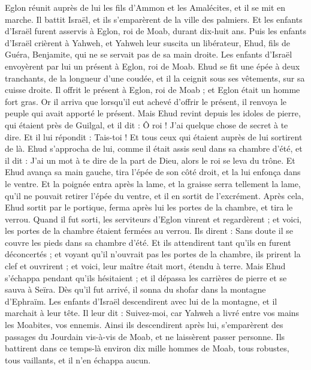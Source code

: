 \begin{multicols}{2}
Eglon réunit auprès de lui les fils d'Ammon et les Amalécites, et il se mit en marche. Il battit Israël, et ils s'emparèrent de la ville des palmiers.
Et les enfants d'Israël furent asservis à Eglon, roi de Moab, durant dix-huit ans.
Puis les enfants d'Israël crièrent à Yahweh, et Yahweh leur suscita un libérateur, Ehud, fils de Guéra, Benjamite, qui ne se servait pas de sa main droite. Les enfants d'Israël envoyèrent par lui un présent à Eglon, roi de Moab.
Ehud se fit une épée à deux tranchants, de la longueur d'une coudée, et il la ceignit sous ses vêtements, sur sa cuisse droite.
Il offrit le présent à Eglon, roi de Moab ; et Eglon était un homme fort gras.
Or il arriva que lorsqu’il eut achevé d’offrir le présent, il renvoya le peuple qui avait apporté le présent.
Mais Ehud revint depuis les idoles de pierre, qui étaient près de Guilgal, et il dit : Ô roi ! J’ai quelque chose de secret à te dire. Et il lui répondit : Tais-toi ! Et tous ceux qui étaient auprès de lui sortirent de là.
Ehud s'approcha de lui, comme il était assis seul dans sa chambre d'été, et il dit : J'ai un mot à te dire de la part de Dieu, alors le roi se leva du trône.
Et Ehud avança sa main gauche, tira l'épée de son côté droit, et la lui enfonça dans le ventre.
Et la poignée entra après la lame, et la graisse serra tellement la lame, qu’il ne pouvait retirer l’épée du ventre, et il en sortit de l’excrément.
Après cela, Ehud sortit par le portique, ferma après lui les portes de la chambre, et tira le verrou.
Quand il fut sorti, les serviteurs d'Eglon vinrent et regardèrent ; et voici, les portes de la chambre étaient fermées au verrou. Ils dirent : Sans doute il se couvre les pieds dans sa chambre d’été.
Et ils attendirent tant qu'ils en furent déconcertés ; et voyant qu'il n'ouvrait pas les portes de la chambre, ils prirent la clef et ouvrirent ; et voici, leur maître était mort, étendu à terre.
Mais Ehud s'échappa pendant qu’ils hésitaient ; et il dépassa les carrières de pierre et se sauva à Seïra.
Dès qu’il fut arrivé, il sonna du shofar dans la montagne d'Ephraïm. Les enfants d'Israël descendirent avec lui de la montagne, et il marchait à leur tête.
Il leur dit : Suivez-moi, car Yahweh a livré entre vos mains les Moabites, vos ennemis. Ainsi ils descendirent après lui, s’emparèrent des passages du Jourdain vis-à-vis de Moab, et ne laissèrent passer personne.
Ils battirent dans ce temps-là environ dix mille hommes de Moab, tous robustes, tous vaillants, et il n'en échappa aucun.

\end{multicols}
